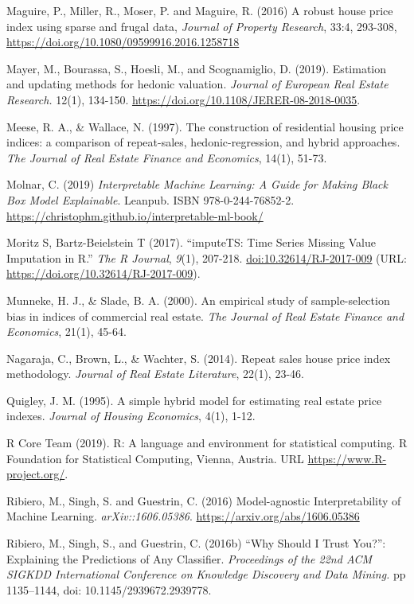 \documentclass[
]{article}
\begin{document}
Maguire, P., Miller, R., Moser, P. and Maguire, R. (2016) A robust house
price index using sparse and frugal data, \emph{Journal of Property
Research}, 33:4, 293-308,
\url{https://doi.org/10.1080/09599916.2016.1258718}

Mayer, M., Bourassa, S., Hoesli, M., and Scognamiglio, D. (2019).
Estimation and updating methods for hedonic valuation. \emph{Journal of
European Real Estate Research.} 12(1), 134-150.
\url{https://doi.org/10.1108/JERER-08-2018-0035}.

Meese, R. A., \& Wallace, N. (1997). The construction of residential
housing price indices: a comparison of repeat-sales, hedonic-regression,
and hybrid approaches. \emph{The Journal of Real Estate Finance and
Economics}, 14(1), 51-73.

Molnar, C. (2019) \emph{Interpretable Machine Learning: A Guide for
Making Black Box Model Explainable}. Leanpub. ISBN 978-0-244-76852-2.
\url{https://christophm.github.io/interpretable-ml-book/}

Moritz S, Bartz-Beielstein T (2017). ``imputeTS: Time Series Missing
Value Imputation in R.'' \emph{The R Journal}, \emph{9}(1), 207-218.
\url{doi:10.32614/RJ-2017-009} (URL:
\url{https://doi.org/10.32614/RJ-2017-009}).

Munneke, H. J., \& Slade, B. A. (2000). An empirical study of
sample-selection bias in indices of commercial real estate. \emph{The
Journal of Real Estate Finance and Economics}, 21(1), 45-64.

Nagaraja, C., Brown, L., \& Wachter, S. (2014). Repeat sales house price
index methodology. \emph{Journal of Real Estate Literature}, 22(1),
23-46.

Quigley, J. M. (1995). A simple hybrid model for estimating real estate
price indexes. \emph{Journal of Housing Economics}, 4(1), 1-12.

R Core Team (2019). R: A language and environment for statistical
computing. R Foundation for Statistical Computing, Vienna, Austria. URL
\url{https://www.R-project.org/}.

Ribiero, M., Singh, S. and Guestrin, C. (2016) Model-agnostic
Interpretability of Machine Learning. \emph{arXiv::1606.05386}.
\url{https://arxiv.org/abs/1606.05386}

Ribiero, M., Singh, S., and Guestrin, C. (2016b) ``Why Should I Trust
You?'': Explaining the Predictions of Any Classifier. \emph{Proceedings
of the 22nd ACM SIGKDD International Conference on Knowledge Discovery
and Data Mining.} pp 1135--1144, doi: 10.1145/2939672.2939778.
\end{document}
